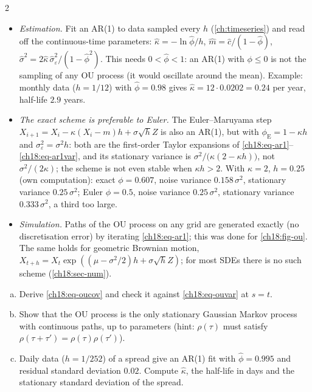 \begin{paracol}{2}
\begin{itemize}
  \item \emph{Estimation.} Fit an AR(1) to data sampled every $h$ (\cref{ch:timeseries}) and read off the continuous-time parameters: $\hat\kappa=-\ln\hat\phi/h$, $\hat m=\hat c/(1-\hat\phi)$, $\hat\sigma^2=2\hat\kappa\,\hat\sigma_\varepsilon^2/(1-\hat\phi^2)$. This needs $0<\hat\phi<1$: an AR(1) with $\phi\le0$ is not the sampling of any OU process (it would oscillate around the mean). Example: monthly data ($h=1/12$) with $\hat\phi=0.98$ gives $\hat\kappa=12\cdot0.0202=0.24$ per year, half-life $2.9$ years.
  \item \emph{The exact scheme is preferable to Euler.} The Euler--Maruyama step $X_{i+1}=X_i-\kappa(X_i-m)h+\sigma\sqrt hZ$ is also an AR(1), but with $\phi_{\mathrm{E}}=1-\kappa h$ and $\sigma_\varepsilon^2=\sigma^2h$: both are the first-order Taylor expansions of \eqref{ch18:eq-ar1}--\eqref{ch18:eq-ar1var}, and its stationary variance is $\sigma^2/\bigl(\kappa(2-\kappa h)\bigr)$, not $\sigma^2/(2\kappa)$; the scheme is not even stable when $\kappa h>2$. With $\kappa=2$, $h=0.25$ (own computation): exact $\phi=0.607$, noise variance $0.158\,\sigma^2$, stationary variance $0.25\,\sigma^2$; Euler $\phi=0.5$, noise variance $0.25\,\sigma^2$, stationary variance $0.333\,\sigma^2$, a third too large.
  \item \emph{Simulation.} Paths of the OU process on any grid are generated exactly (no discretisation error) by iterating \eqref{ch18:eq-ar1}; this was done for \cref{ch18:fig-ou}. The same holds for geometric Brownian motion, $X_{t+h}=X_t\exp((\mu-\sigma^2/2)h+\sigma\sqrt hZ)$; for most SDEs there is no such scheme (\cref{ch18:sec-num}).
\end{itemize}

\begin{exercise}\label{ch18:ex-ou}
\leavevmode
\begin{enumerate}[(a)]
  \item Derive \eqref{ch18:eq-oucov} and check it against \eqref{ch18:eq-ouvar} at $s=t$.
  \item Show that the OU process is the only stationary Gaussian Markov process with continuous paths, up to parameters (hint: $\rho(\tau)$ must satisfy $\rho(\tau+\tau')=\rho(\tau)\rho(\tau')$).
  \item Daily data ($h=1/252$) of a spread give an AR(1) fit with $\hat\phi=0.995$ and residual standard deviation $0.02$. Compute $\hat\kappa$, the half-life in days and the stationary standard deviation of the spread.
\end{enumerate}
\end{exercise}


\end{paracol}
